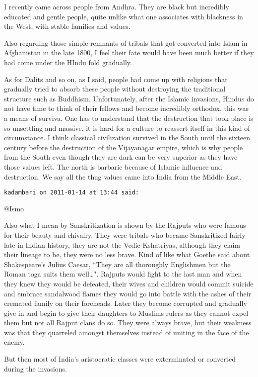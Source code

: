 \begin{footnotesize}
\begin{sffamily}
I recently came across people from Andhra. They are black but incredibly educated and gentle people, quite unlike what one associates with blackness in the West, with stable families and values.

Also regarding those simple remnants of tribals that got converted into Islam in Afghanistan in the late 1800, I feel their fate would have been much better if they had come under the HIndu fold gradually.

As for Dalits and so on, as I said, people had come up with religions that gradually tried to absorb these people without destroying the traditional structure such as Buddhism. Unfortunately, after the Islamic invasions, Hindus do not have time to think of their fellows and become incredibly orthodox, this was a means of surviva. One has to understand that the destruction that took place is so unsettling and massive, it is hard for a culture to reassert itself in this kind of circumstance. I think classical civilization survived in the South until the sixteen century before the destruction of the Vijayanagar empire, which is why people from the South even though they are dark can be very superior as they have those values left. The north is barbaric because of Islamic influence and destruction. We say all the thug values came into India from the Middle East.


\hfill

\texttt{kadambari on 2011-01-14 at 13:44 said: }

@Ismo

Also what I mean by Sanskritization is shown by the Rajputs who were famous for their beauty and chivalry. They were tribals who became Sanskritized fairly late in Indian history, they are not the Vedic Kshatriyas, although they claim their lineage to be, they were no less brave. Kind of like what Goethe said about Shakespeare's Julius Caesar, ``They are all thoroughly Englishmen but the Roman toga suits them well…". Rajputs would fight to the last man and when they knew they would be defeated, their wives and children would commit suicide and embrace sandalwood flames they would go into battle with the ashes of their cremated family on their foreheads. Later they become corrupted and gradually give in and begin to give their daughters to Muslims rulers as they cannot expel them but not all Rajput clans do so. They were always brave, but their weakness was that they quarreled amongst themselves instead of uniting in the face of the enemy.

But then most of India's aristocratic classes were exterminated or converted during the invasions.


\end{sffamily}
\end{footnotesize}
